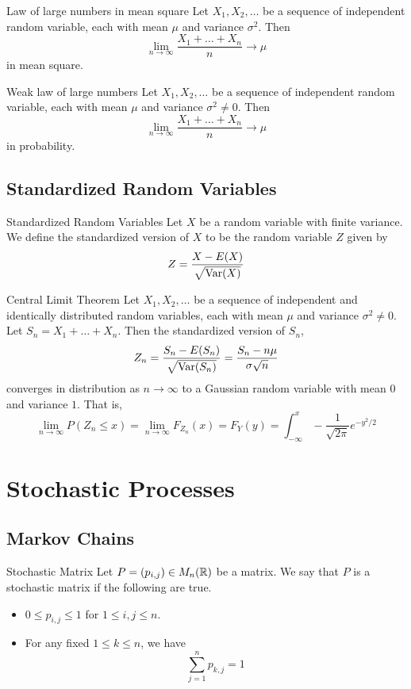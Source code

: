 \documentclass[a4paper]{article}
\begin{document}
\begin{thm}{Law of large numbers in mean square}{} Let $X_1,X_2,\dots$ be a sequence of independent random variable, each with mean $\mu$ and variance $\sigma^2$. Then $$\lim_{n\to\infty}\frac{X_1+\dots+X_n}{n}\to\mu$$ in mean square. 
\end{thm}

\begin{thm}{Weak law of large numbers}{} Let $X_1,X_2,\dots$ be a sequence of independent random variable, each with mean $\mu$ and variance $\sigma^2\neq 0$. Then $$\lim_{n\to\infty}\frac{X_1+\dots+X_n}{n}\to\mu$$ in probability. 
\end{thm}

\subsection{Standardized Random Variables}
\begin{defn}{Standardized Random Variables}{} Let $X$ be a random variable with finite variance. We define the standardized version of $X$ to be the random variable $Z$ given by $$Z=\frac{X-E(X)}{\sqrt{\operatorname{Var}(X)}}$$
\end{defn}

\begin{thm}{Central Limit Theorem}{} Let $X_1,X_2,\dots$ be a sequence of independent and identically distributed random variables, each with mean $\mu$ and variance $\sigma^2\neq 0$. Let $S_n=X_1+\dots+X_n$. Then the standardized version of $S_n$, $$Z_n=\frac{S_n-E(S_n)}{\sqrt{\operatorname{Var}(S_n)}}=\frac{S_n-n\mu}{\sigma\sqrt{n}}$$ converges in distribution as $n\to\infty$ to a Gaussian random variable with mean $0$ and variance $1$. That is, $$\lim_{n\to\infty}P(Z_n\leq x)=\lim_{n\to\infty}F_{Z_n}(x)=F_Y(y)=\int_{-\infty}^{x}-\frac{1}{\sqrt{2\pi}}e^{-y^2/2}$$
\end{thm}

\pagebreak
\section{Stochastic Processes}
\subsection{Markov Chains}
\begin{defn}{Stochastic Matrix}{} Let $P=(p_{i,j})\in M_n(\mathbb{R})$ be a matrix. We say that $P$ is a stochastic matrix if the following are true. 
\begin{itemize}
\item $0\leq p_{i,j}\leq 1$ for $1\leq i,j\leq n$. 
\item For any fixed $1\leq k\leq n$, we have $$\sum_{j=1}^np_{k,j}=1$$
\end{itemize}
\end{defn}
\end{document}
